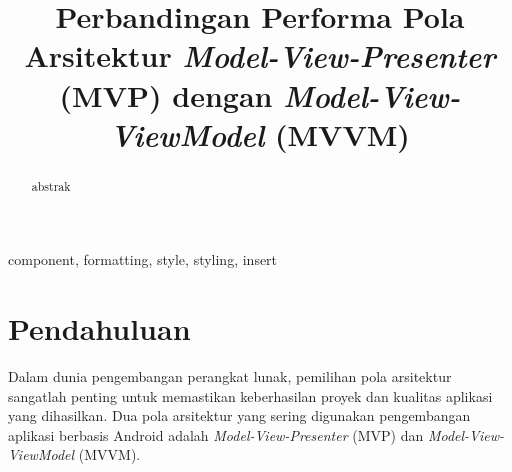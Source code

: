 \documentclass[conference]{IEEEtran}
\begin{document}
	
	\title{Perbandingan Performa Pola Arsitektur \textit{Model-View-Presenter} (MVP) dengan \textit{Model-View-ViewModel} (MVVM)\\
	}
	
	\author{
		\and
		\and
		\and
	}
	
	\maketitle
	
	\begin{abstract}
		abstrak
	\end{abstract}
	
	\begin{IEEEkeywords}
		component, formatting, style, styling, insert
	\end{IEEEkeywords}
	
	\section{Pendahuluan}
	Dalam dunia pengembangan perangkat lunak, pemilihan pola arsitektur sangatlah penting untuk memastikan keberhasilan proyek dan kualitas aplikasi yang dihasilkan. Dua pola arsitektur yang sering digunakan pengembangan aplikasi berbasis Android adalah \textit{Model-View-Presenter} (MVP) dan \textit{Model-View-ViewModel} (MVVM). 
 
\end{document}
